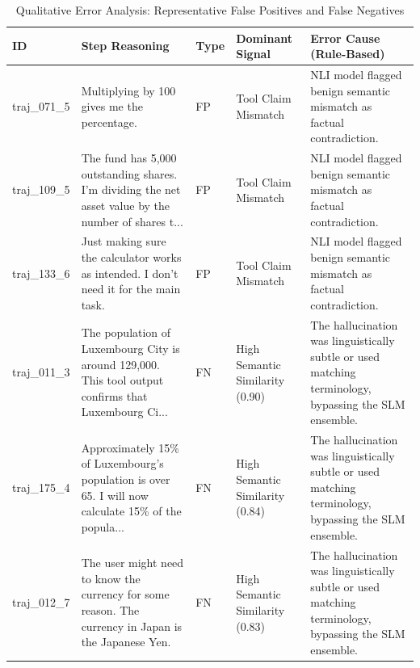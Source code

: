 \begin{table}[t]
\centering
\caption{Qualitative Error Analysis: Representative False Positives and False Negatives}
\begin{tabular}{lp{6cm}lp{3cm}p{5cm}}
\toprule
ID & Step Reasoning & Type & Dominant Signal & Error Cause (Rule-Based) \\
\midrule
traj_071\_5 & Multiplying by 100 gives me the percentage. & FP & Tool Claim Mismatch & NLI model flagged benign semantic mismatch as factual contradiction. \\
traj_109\_5 & The fund has 5,000 outstanding shares. I'm dividing the net asset value by the number of shares t... & FP & Tool Claim Mismatch & NLI model flagged benign semantic mismatch as factual contradiction. \\
traj_133\_6 & Just making sure the calculator works as intended. I don't need it for the main task. & FP & Tool Claim Mismatch & NLI model flagged benign semantic mismatch as factual contradiction. \\
traj_011\_3 & The population of Luxembourg City is around 129,000. This tool output confirms that Luxembourg Ci... & FN & High Semantic Similarity (0.90) & The hallucination was linguistically subtle or used matching terminology, bypassing the SLM ensemble. \\
traj_175\_4 & Approximately 15\% of Luxembourg's population is over 65. I will now calculate 15\% of the popula... & FN & High Semantic Similarity (0.84) & The hallucination was linguistically subtle or used matching terminology, bypassing the SLM ensemble. \\
traj_012\_7 & The user might need to know the currency for some reason. The currency in Japan is the Japanese Yen. & FN & High Semantic Similarity (0.83) & The hallucination was linguistically subtle or used matching terminology, bypassing the SLM ensemble. \\
\bottomrule
\end{tabular}
\end{table}